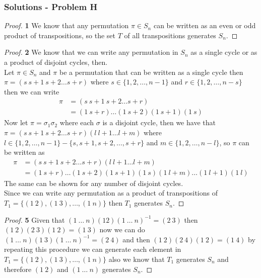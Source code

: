 \documentclass[11pt]{article}
\begin{document}
		\subsubsection*{Solutions - Problem H}
		\begin{proof}{\textbf{1}}
			We know that any permutation $\pi \in S_n$ can be written as an
			even or odd product of transpositions, so the set $T$ of all
			transpositions generates $S_n$. 
		\end{proof}
		\begin{proof}{\textbf{2}}
			We know that we can write any permutation in $S_n$ as a single cycle
			or as a product of disjoint cycles, then.\\
			Let $\pi \in S_n$ and $\pi$ be a permutation that can be written as
			a single cycle then $\pi=(s~s+1~s+2 \dots s+r)$ where 
			$s \in \{1,2, \dots, n-1\}$ and $r \in \{1,2, \dots, n-s\}$ then we can
			write
			\begin{align*}
				\pi &= (s~s+1~s+2 \dots s+r)\\
				    &= (1~s+r) \dots (1~s+2)(1~s+1)(1~s)
			\end{align*}
			Now let $\pi=\sigma_1\sigma_2$ where each $\sigma$ is a disjoint cycle,
			then we have that $\pi=(s~s+1~s+2 \dots s+r)(l~l+1 \dots l+m)$ where 
			$l \in \{1,2, \dots, n-1\} - \{s,s+1,s+2, \dots, s+r\}$ and
			$m \in \{1,2, \dots, n-l\}$, so $\pi$ can be written as
			\begin{align*}
				\pi &= (s~s+1~s+2 \dots s+r)(l~l+1 \dots l+m)\\
				    &= (1~s+r) \dots (1~s+2)(1~s+1)(1~s)(1~l+m) \dots (1~l+1)(1~l)
			\end{align*}
			The same can be shown for any number of disjoint cycles.\\
			Since we can write any permutation as a product of transpositions of
			$T_1 = \{(1~2),(1~3), \dots, (1~n)\}$ then $T_1$ generates $S_n$.
		\end{proof}
		\begin{proof}{\textbf{5}}
			Given that $(1~ \dots ~n)(12)(1~ \dots ~n)^{-1} = (2~3)$ then
			$(1~2)(2~3)(1~2)=(1~3)$ now we can do 
			$(1~ \dots ~n)(1~3)(1~ \dots ~n)^{-1} = (2~4)$ and then
			$(1~2)(2~4)(1~2)=(1~4)$ by repeating this procedure we can generate
			each element in $T_1 = \{(1~2),(1~3), \dots, (1~n)\}$ also we know
			that $T_1$ generates $S_n$ and therefore $(1~2)$ and
			$(1~ \dots ~n)$ generates $S_n$.
		\end{proof}
\end{document}
